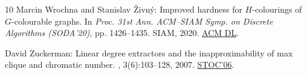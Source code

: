\begin{thebibliography}{10}
{\sc Marcin Wrochna and Stanislav {\v Z}ivn{\' y}}: Improved hardness for
  ${H}$-colourings of ${G}$-colourable graphs.
\newblock In {\em Proc. 31st Ann. ACM--SIAM Symp. on Discrete Algorithms
  (SODA'20)}, pp. 1426--1435. SIAM, 2020.
\newblock \href{https://dl.acm.org/doi/abs/10.5555/3381089.3381175}{ACM DL}.

{\sc David Zuckerman}: Linear degree extractors and the inapproximability of
  max clique and chromatic number.
, 3(6):103--128, 2007.
\newblock \prelim \href{https:doi.org/10.1145/1132516.1132612}{STOC'06}.

\end{thebibliography}